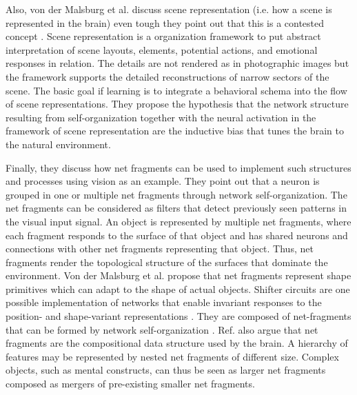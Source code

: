 Also, von der Malsburg et al. \cite{von_der_Malsburg_Stadelmann_Grewe_2022} discuss scene representation (i.e. how a scene is represented in the brain) even tough they point out that this is a contested concept .
Scene representation is a organization framework to put abstract interpretation of scene layouts, elements, potential actions, and emotional responses in relation.
The details are not rendered as in photographic images but the framework supports the detailed reconstructions of narrow sectors of the scene.
The basic goal if learning is to integrate a behavioral schema into the flow of scene representations.
They propose the hypothesis that the network structure resulting from self-organization together with the neural activation in the framework of scene representation are the inductive bias that tunes the brain to the natural environment.

Finally, they discuss how net fragments can be used to implement such structures and processes using vision as an example.
They point out that a neuron is grouped in one or multiple net fragments through network self-organization.
The net fragments can be considered as filters that detect previously seen patterns in the visual input signal.
An object is represented by multiple net fragments, where each fragment responds to the surface of that object and has shared neurons and connections with other net fragments representing that object.
Thus, net fragments render the topological structure of the surfaces that dominate the environment.
Von der Malsburg et al. \cite{von_der_Malsburg_Stadelmann_Grewe_2022} propose that net fragments represent shape primitives which can adapt to the shape of actual objects.
Shifter circuits are one possible implementation of networks that enable invariant responses to the position- and shape-variant representations .
They are composed of net-fragments that can be formed by network self-organization .
Ref. \cite{von_der_Malsburg_Stadelmann_Grewe_2022} also argue that net fragments are the compositional data structure used by the brain.
A hierarchy of features may be represented by nested net fragments of different size.
Complex objects, such as mental constructs, can thus be seen as larger net fragments composed as mergers of pre-existing smaller net fragments.


